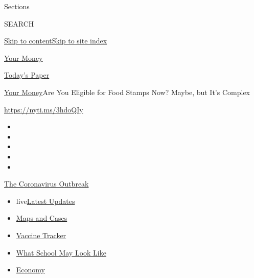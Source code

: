 Sections

SEARCH

\protect\hyperlink{site-content}{Skip to
content}\protect\hyperlink{site-index}{Skip to site index}

\href{https://www.nytimes.com/section/your-money}{Your Money}

\href{https://myaccount.nytimes.com/auth/login?response_type=cookie\&client_id=vi}{}

\href{https://www.nytimes.com/section/todayspaper}{Today's Paper}

\href{/section/your-money}{Your Money}\textbar{}Are You Eligible for
Food Stamps Now? Maybe, but It's Complex

\url{https://nyti.ms/3hdoQIy}

\begin{itemize}
\item
\item
\item
\item
\item
\end{itemize}

\href{https://www.nytimes.com/news-event/coronavirus?action=click\&pgtype=Article\&state=default\&region=TOP_BANNER\&context=storylines_menu}{The
Coronavirus Outbreak}

\begin{itemize}
\tightlist
\item
  live\href{https://www.nytimes.com/2020/08/01/world/coronavirus-covid-19.html?action=click\&pgtype=Article\&state=default\&region=TOP_BANNER\&context=storylines_menu}{Latest
  Updates}
\item
  \href{https://www.nytimes.com/interactive/2020/us/coronavirus-us-cases.html?action=click\&pgtype=Article\&state=default\&region=TOP_BANNER\&context=storylines_menu}{Maps
  and Cases}
\item
  \href{https://www.nytimes.com/interactive/2020/science/coronavirus-vaccine-tracker.html?action=click\&pgtype=Article\&state=default\&region=TOP_BANNER\&context=storylines_menu}{Vaccine
  Tracker}
\item
  \href{https://www.nytimes.com/interactive/2020/07/29/us/schools-reopening-coronavirus.html?action=click\&pgtype=Article\&state=default\&region=TOP_BANNER\&context=storylines_menu}{What
  School May Look Like}
\item
  \href{https://www.nytimes.com/live/2020/07/31/business/stock-market-today-coronavirus?action=click\&pgtype=Article\&state=default\&region=TOP_BANNER\&context=storylines_menu}{Economy}
\end{itemize}


